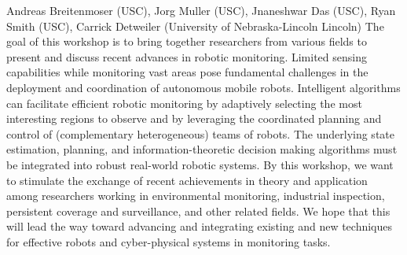 \begin{spacing}{1.0}
{Andreas Breitenmoser (USC), Jorg Muller (USC), Jnaneshwar Das (USC), Ryan Smith (USC), Carrick Detweiler (University of Nebraska-Lincoln Lincoln)}
{
The goal of this workshop is to bring together researchers from various fields to present and discuss recent advances in robotic monitoring. Limited sensing capabilities while monitoring vast areas pose fundamental challenges in the deployment and coordination of autonomous mobile robots. Intelligent algorithms can facilitate efficient robotic monitoring by adaptively selecting the most interesting regions to observe and by leveraging the coordinated planning and control of (complementary heterogeneous) teams of robots. The underlying state estimation, planning, and information-theoretic decision making algorithms must be integrated into robust real-world robotic systems. By this workshop, we want to stimulate the exchange of recent achievements in theory and application among researchers working in environmental monitoring, industrial inspection, persistent coverage and surveillance, and other related fields. We hope that this will lead the way toward advancing and integrating existing and new techniques for effective robots and cyber-physical systems in monitoring tasks.
}

\clearpage


\end{spacing}
